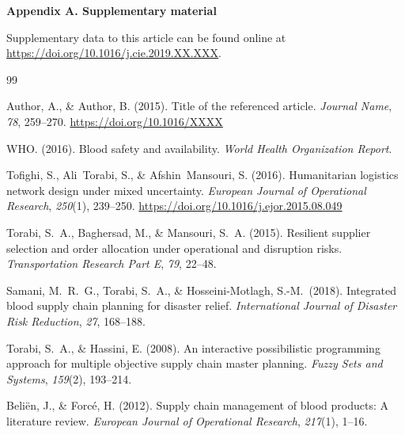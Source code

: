 \documentclass[10pt,twocolumn]{article}
\begin{document}
\vspace{4pt}
\noindent\textbf{Appendix A. Supplementary material}

\noindent Supplementary data to this article can be found online at
\url{https://doi.org/10.1016/j.cie.2019.XX.XXX}.

\balance
\vspace{4pt}

\begin{thebibliography}{99}
\setlength{\itemsep}{1pt}
\setlength{\parskip}{0pt}

Author, A., \& Author, B. (2015).
Title of the referenced article.
\textit{Journal Name}, \textit{78}, 259--270.
\url{https://doi.org/10.1016/XXXX}

WHO. (2016).
Blood safety and availability.
\textit{World Health Organization Report}.

Tofighi, S., Ali~Torabi, S., \& Afshin~Mansouri, S. (2016).
Humanitarian logistics network design under mixed uncertainty.
\textit{European Journal of Operational Research},
\textit{250}(1), 239--250.
\url{https://doi.org/10.1016/j.ejor.2015.08.049}

Torabi, S.~A., Baghersad, M., \& Mansouri, S.~A. (2015).
Resilient supplier selection and order allocation under operational
and disruption risks.
\textit{Transportation Research Part E},
\textit{79}, 22--48.

Samani, M.~R.~G., Torabi, S.~A., \& Hosseini-Motlagh, S.-M.\ (2018).
Integrated blood supply chain planning for disaster relief.
\textit{International Journal of Disaster Risk Reduction},
\textit{27}, 168--188.

Torabi, S.~A., \& Hassini, E. (2008).
An interactive possibilistic programming approach for multiple
objective supply chain master planning.
\textit{Fuzzy Sets and Systems},
\textit{159}(2), 193--214.

Beli\"{e}n, J., \& Forc\'{e}, H. (2012).
Supply chain management of blood products: A literature review.
\textit{European Journal of Operational Research},
\textit{217}(1), 1--16.


\end{thebibliography}
\end{document}
